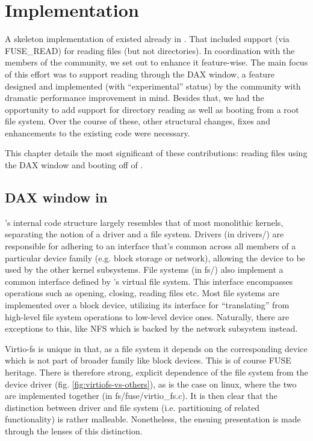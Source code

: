 \chapter{Implementation}

A skeleton implementation of \viofs{} existed already in \osv{}. %
That included support (via FUSE\_READ) for reading files (but not directories).
In coordination with the members of the \osv{} community, we set out to enhance
it feature-wise. The main focus of this effort was to support reading through
the \viofs{} DAX window, a feature designed and implemented (with
``experimental'' status) by the \viofs{} community with dramatic performance
improvement in mind. Besides that, we had the opportunity to add support for
directory reading as well as booting \osv{} from a \viofs{} root file system.
Over the course of these, other structural changes, fixes and enhancements to
the existing code were necessary.

This chapter details the most significant of these contributions: reading files
using the DAX window and booting off of \viofs{}.

\section{DAX window in \viofs{}}

\osv{}'s internal code structure largely resembles that of most monolithic
kernels, separating the notion of a driver and a file system. Drivers (in
drivers/) are responsible for adhering to an interface that's common across all
members of a particular device family (e.g. block storage or network), allowing
the device to be used by the other kernel subsystems. File systems (in fs/)
also implement a common interface defined by \osv{}'s virtual file system. This
interface encompasses operations such as opening, closing, reading files etc.
Most file systems are implemented over a block device, utilizing its interface
for ``translating'' from high-level file system operations to low-level device
ones. Naturally, there are exceptions to this, like NFS which is backed by the
network subsystem instead.

Virtio-fs is unique in that, as a file system it depends on the corresponding
device which is not part of broader family like block devices. This is of course
FUSE heritage. There is therefore strong, explicit dependence of the \viofs{}
file system from the \viofs{} device driver (fig. \ref{fig:virtiofs-vs-others}),
as is the case on linux, where the two are implemented together (in
fs/fuse/virtio\_fs.c). It is then clear that the distinction between \viofs{}
driver and file system (i.e. partitioning of related functionality) is rather
malleable. Nonetheless, the ensuing presentation is made through the lenses of
this distinction.

